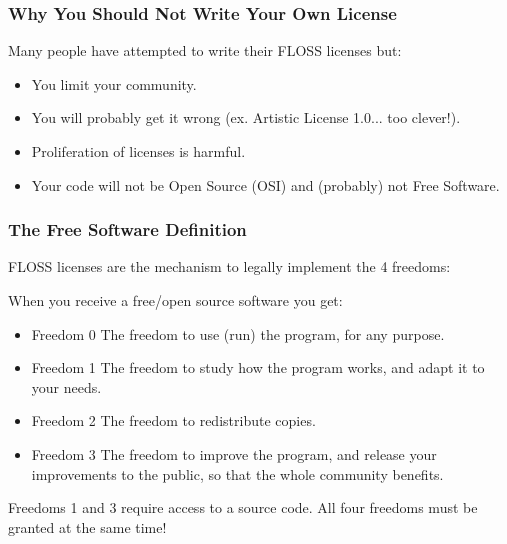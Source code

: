 \documentclass{beamer}
\begin{document}
\begin{frame}
\frametitle{Why You Should Not Write Your Own License}

Many people have attempted to write their FLOSS licenses but:

\begin{itemize}
\item You limit your community. 
\item You will probably get it wrong (ex. Artistic License 1.0... too clever!).
\item Proliferation of licenses is harmful. 
\item Your code will not be Open Source (OSI) and (probably) not Free Software.
\end{itemize}

\end{frame}




\begin{frame}
\frametitle{The Free Software Definition}
\alert{FLOSS licenses are the mechanism to legally implement the 4 freedoms}:

\medskip
\small
When you receive a free/open source software you get:
\begin{itemize}
\item {\alert{Freedom 0} The freedom to use (run) the program, for any purpose.}
\item {\alert{Freedom 1} The freedom to study how the program works, and adapt it to your needs. }
\item {\alert{Freedom 2} The freedom to redistribute copies.}
\item {\alert{Freedom 3} The freedom to improve the program, and release your improvements to the public, so that the whole community benefits. }
\end{itemize}

\pause
\footnotesize
Freedoms 1 and 3 require access to a source code. All four freedoms must be granted \alert{at the same time}! 


\end{frame}

\end{document}
